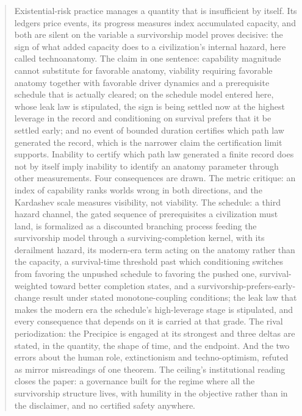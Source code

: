 \maketitle

\begin{abstract}
Existential-risk practice manages a quantity that is insufficient by itself. Its ledgers price
events, its progress measures index accumulated capacity, and both are
silent on the variable a survivorship model proves decisive: the sign of
what added capacity does to a civilization's internal hazard, here called
technoanatomy. The claim in one sentence: capability magnitude cannot substitute for
favorable anatomy, viability requiring favorable anatomy together with
favorable driver dynamics and a prerequisite schedule that is actually
cleared; on the schedule model entered here, whose leak law is
stipulated, the sign is being settled now at the highest leverage in the
record and conditioning on survival prefers that it be settled early;
and no event of bounded duration certifies which path law generated the record, which is the narrower claim the certification limit supports. Inability to certify which path law generated a finite record does not by itself imply inability to identify an anatomy parameter through other measurements. Four consequences
are drawn. The metric critique: an index of capability ranks worlds wrong
in both directions, and the Kardashev scale measures visibility, not
viability. The schedule: a third hazard channel, the gated sequence of
prerequisites a civilization must land, is formalized as a discounted
branching process feeding the survivorship model through a
surviving-completion kernel, with its derailment hazard, its modern-era
term acting on the anatomy rather than the capacity, a survival-time
threshold past which conditioning switches from favoring the unpushed
schedule to favoring the pushed one, survival-weighted toward better
completion states, and a
survivorship-prefers-early-change result under stated monotone-coupling
conditions; the leak law that makes the modern era the schedule's
high-leverage stage is stipulated, and every consequence that depends on
it is carried at that grade.
The rival periodization: the Precipice is engaged at its strongest and
three deltas are stated, in the quantity, the shape of time, and the
endpoint. And the two errors about the human role, extinctionism and
techno-optimism, refuted as mirror misreadings of one theorem. The
ceiling's institutional reading closes the paper: a governance built for
the regime where all the survivorship structure lives, with humility in
the objective rather than in the disclaimer, and no certified safety
anywhere.
\end{abstract}

